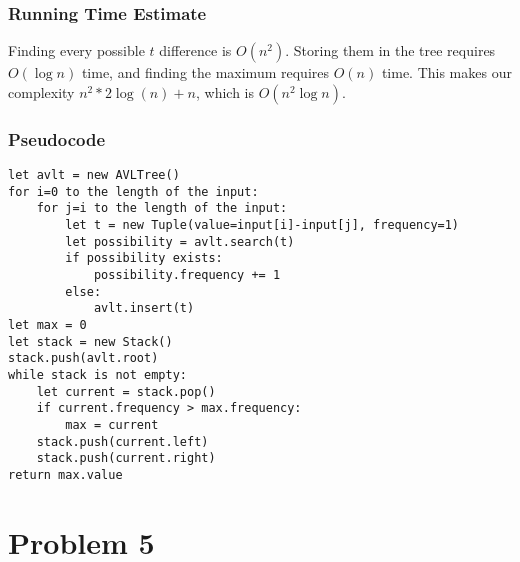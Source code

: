 \documentclass[letterpaper, 12pt]{math}
\begin{document}
\subsubsection*{Running Time Estimate}
Finding every possible \( t \) difference is \( O(n^2) \). Storing them in the
tree requires \( O(\log n) \) time, and finding the maximum requires \( O(n) \)
time. This makes our complexity \( n^2*2\log(n)+n \), which is
\( O(n^2\log n) \).

\subsubsection*{Pseudocode}
\begin{lstlisting}
let avlt = new AVLTree()
for i=0 to the length of the input:
    for j=i to the length of the input:
        let t = new Tuple(value=input[i]-input[j], frequency=1)
        let possibility = avlt.search(t)
        if possibility exists:
            possibility.frequency += 1
        else:
            avlt.insert(t)
let max = 0
let stack = new Stack()
stack.push(avlt.root)
while stack is not empty:
    let current = stack.pop()
    if current.frequency > max.frequency:
        max = current
    stack.push(current.left)
    stack.push(current.right)
return max.value
\end{lstlisting}

\section*{Problem 5}
\end{document}
